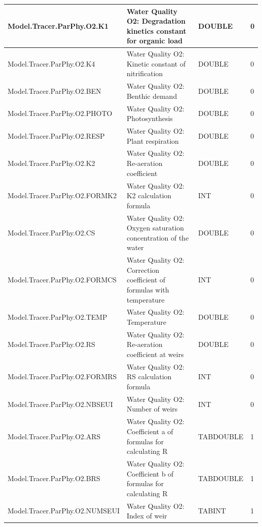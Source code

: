 \documentclass[a4paper,11pt]{article}
\begin{document}
\begin{landscape}
\begin{table}[ht]
\begin{center}
\begin{tabular}{|l|l|l|l|}

\hline Model.Tracer.ParPhy.O2.K1 & Water Quality O2:  Degradation kinetics constant for organic load & DOUBLE & 0 \\
\hline Model.Tracer.ParPhy.O2.K4 & Water Quality O2: Kinetic constant of nitrification & DOUBLE & 0 \\
\hline Model.Tracer.ParPhy.O2.BEN & Water Quality O2: Benthic demand & DOUBLE & 0 \\
\hline Model.Tracer.ParPhy.O2.PHOTO & Water Quality O2: Photosynthesis & DOUBLE & 0 \\
\hline Model.Tracer.ParPhy.O2.RESP & Water Quality O2: Plant respiration & DOUBLE & 0 \\
\hline Model.Tracer.ParPhy.O2.K2 & Water Quality O2: Re-aeration coefficient & DOUBLE & 0 \\
\hline Model.Tracer.ParPhy.O2.FORMK2 & Water Quality O2: K2 calculation formula & INT & 0 \\
\hline Model.Tracer.ParPhy.O2.CS & Water Quality O2: Oxygen saturation concentration of the water & DOUBLE & 0 \\
\hline Model.Tracer.ParPhy.O2.FORMCS & Water Quality O2: Correction coefficient of formulas with temperature & INT & 0 \\
\hline Model.Tracer.ParPhy.O2.TEMP & Water Quality O2: Temperature & DOUBLE & 0 \\
\hline Model.Tracer.ParPhy.O2.RS & Water Quality O2: Re-aeration coefficient at weirs & DOUBLE & 0 \\
\hline Model.Tracer.ParPhy.O2.FORMRS & Water Quality O2: RS calculation formula & INT & 0 \\
\hline Model.Tracer.ParPhy.O2.NBSEUI & Water Quality O2: Number of weirs & INT & 0 \\
\hline Model.Tracer.ParPhy.O2.ARS & Water Quality O2: Coefficient a of formulas for calculating R & TABDOUBLE & 1 \\
\hline Model.Tracer.ParPhy.O2.BRS & Water Quality O2: Coefficient b of formulas for calculating R & TABDOUBLE & 1 \\
\hline Model.Tracer.ParPhy.O2.NUMSEUI & Water Quality O2: Index of weir & TABINT & 1 \\
\hline 
\end{tabular} 
\end{center}
\end{table}


\end{landscape}
\end{document}

